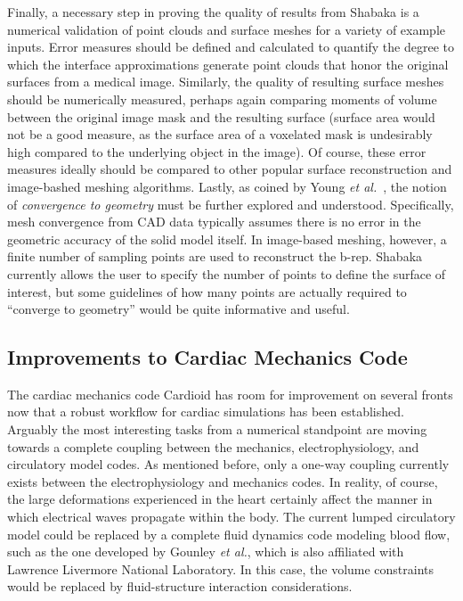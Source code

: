 Finally, a necessary step in proving the quality of results from Shabaka is a numerical validation of point clouds and surface meshes for a variety of example inputs. Error measures should be defined and calculated to quantify the degree to which the interface approximations generate point clouds that honor the original surfaces from a medical image. Similarly, the quality of resulting surface meshes should be numerically measured, perhaps again comparing moments of volume between the original image mask and the resulting surface (surface area would not be a good measure, as the surface area of a voxelated mask is undesirably high compared to the underlying object in the image). Of course, these error measures ideally should be compared to other popular surface reconstruction and image-bashed meshing algorithms. Lastly, as coined by Young \textit{et al.}~\cite{young_2008}, the notion of \textit{convergence to geometry} must be further explored and understood. Specifically, mesh convergence from CAD data typically assumes there is no error in the geometric accuracy of the solid model itself. In image-based meshing, however, a finite number of sampling points are used to reconstruct the b-rep. Shabaka currently allows the user to specify the number of points to define the surface of interest, but some guidelines of how many points are actually required to ``converge to geometry'' would be quite informative and useful.

\subsection{Improvements to Cardiac Mechanics Code}
\label{Improvements to Cardiac Mechanics Code}

The cardiac mechanics code Cardioid has room for improvement on several fronts now that a robust workflow for cardiac simulations has been established. Arguably the most interesting tasks from a numerical standpoint are moving towards a complete coupling between the mechanics, electrophysiology, and circulatory model codes. As mentioned before, only a one-way coupling currently exists between the electrophysiology and mechanics codes. In reality, of course, the large deformations experienced in the heart certainly affect the manner in which electrical waves propagate within the body. The current lumped circulatory model could be replaced by a complete fluid dynamics code modeling blood flow, such as the one developed by Gounley \textit{et al.}, which is also affiliated with Lawrence Livermore National Laboratory. In this case, the volume constraints would be replaced by fluid-structure interaction considerations.

